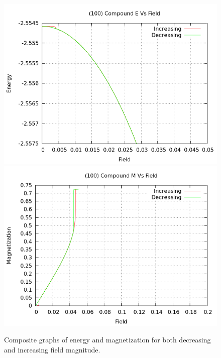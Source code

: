 \documentclass{article}
\begin{document}
\begin{figure}[ht]
\centering
\includegraphics[scale=0.6]{HVariedData/compoundEM/100Ecompound.png}
\includegraphics[scale=0.6]{HVariedData/compoundEM/100Mcompound.png}
\caption{Composite graphs of energy and magnetization for both decreasing and increasing field magnitude.}
\end{figure}
\clearpage
\end{document}
